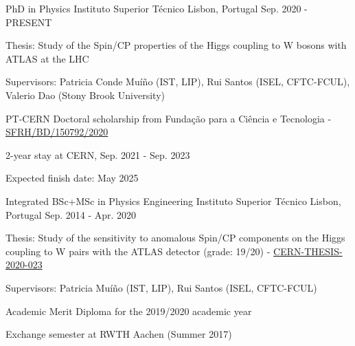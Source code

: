 
\begin{cventries}

\cventry
  {PhD in Physics}
  {Instituto Superior Técnico}
  {Lisbon, Portugal}
  {Sep. 2020 - PRESENT}
  {
    \begin{cvitems}
      \item {Thesis: Study of the Spin/CP properties of the Higgs coupling to W bosons with ATLAS at the LHC}
      \item {Supervisors: Patricia Conde Muíño (IST, LIP), Rui Santos (ISEL, CFTC-FCUL), Valerio Dao (Stony Brook University)}
      \item {PT-CERN Doctoral scholarship from Fundação para a Ciência e Tecnologia - \href{https://doi.org/10.54499/SFRH/BD/150792/2020}{SFRH/BD/150792/2020}}
      \item {2-year stay at CERN, Sep. 2021 - Sep. 2023}
      \item {Expected finish date: May 2025}
    \end{cvitems}
  }

  \cventry
    {Integrated BSc+MSc in Physics Engineering} %
    {Instituto Superior Técnico} %
    {Lisbon, Portugal} %
    {Sep. 2014 - Apr. 2020} %
    {
      \begin{cvitems} %
        \item {Thesis: Study of the sensitivity to anomalous Spin/CP components on the Higgs coupling to W pairs with the ATLAS detector (grade: 19/20) - \href{https://cds.cern.ch/record/2715646}{CERN-THESIS-2020-023}}
        \item {Supervisors: Patricia Muíño (IST, LIP), Rui Santos (ISEL, CFTC-FCUL)}
        \item {Academic Merit Diploma for the 2019/2020 academic year}
        \item {Exchange semester at RWTH Aachen (Summer 2017)}
      \end{cvitems}
    }



\end{cventries}